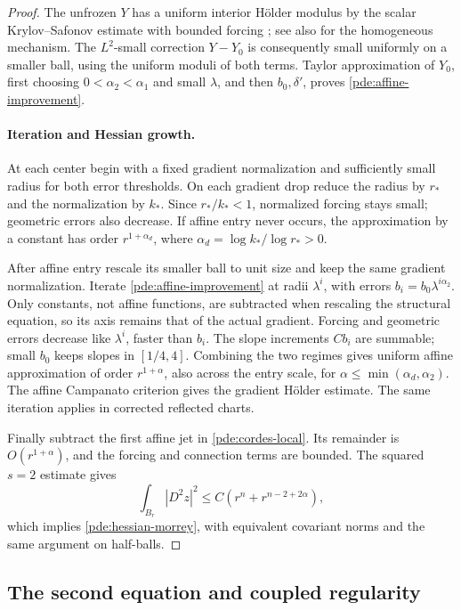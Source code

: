 \begin{proof}
The unfrozen \(Y\) has a uniform interior H\"older modulus by the scalar
Krylov--Safonov estimate with bounded forcing
\cite[Section~9.8]{GilbargTrudinger2001}; see also \cite{Mooney2019}
for the homogeneous mechanism.  The \(L^2\)-small correction
\(Y-Y_0\) is consequently small uniformly on a smaller ball, using
the uniform moduli of both terms.  Taylor approximation of \(Y_0\),
first choosing \(0<\alpha_2<\alpha_1\) and small \(\lambda\), and
then \(b_0,\delta'\), proves \eqref{pde:affine-improvement}.

\paragraph{Iteration and Hessian growth.}
At each center begin with a fixed gradient normalization and sufficiently
small radius for both error thresholds.  On each gradient drop reduce
the radius by \(r_*\) and the normalization by \(k_*\).
Since \(r_*/k_*<1\), normalized forcing stays small; geometric errors
also decrease.  If affine entry never occurs, the approximation by a
constant has order \(r^{1+\alpha_d}\), where
\(\alpha_d=\log k_*/\log r_*>0\).

After affine entry rescale its smaller ball to unit size and keep the
same gradient normalization.  Iterate \eqref{pde:affine-improvement}
at radii \(\lambda^i\), with errors
\(b_i=b_0\lambda^{i\alpha_2}\).
Only constants, not affine functions, are subtracted when rescaling
the structural equation, so its axis remains that of the actual
gradient.  Forcing and geometric errors decrease like \(\lambda^i\),
faster than \(b_i\).  The slope increments \(Cb_i\) are summable;
small \(b_0\) keeps slopes in \([1/4,4]\).
Combining the two regimes gives uniform affine approximation of order
\(r^{1+\alpha}\), also across the entry scale, for
\(\alpha\le\min(\alpha_d,\alpha_2)\).
The affine Campanato criterion gives the gradient H\"older estimate.
The same iteration applies in corrected reflected charts.

Finally subtract the first affine jet in \eqref{pde:cordes-local}.
Its remainder is \(O(r^{1+\alpha})\), and the forcing and connection
terms are bounded.  The squared \(s=2\) estimate gives
\[
 \int_{B_r}|D^2z|^2\le C(r^n+r^{n-2+2\alpha}),
\]
which implies \eqref{pde:hessian-morrey}, with equivalent covariant
norms and the same argument on half-balls.
\end{proof}

\subsection{The second equation and coupled regularity}

